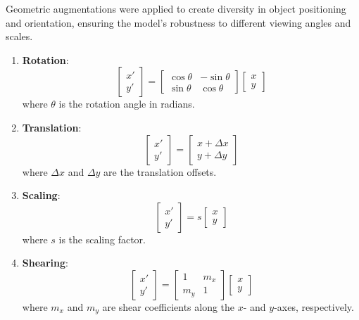 \documentclass[conference]{IEEEtran}
\begin{document}
Geometric augmentations were applied to create diversity in object positioning and orientation, ensuring the model's robustness to different viewing angles and scales.

\begin{enumerate}
    \item \textbf{Rotation}:
    \[
    \begin{bmatrix}
    x' \\ y'
    \end{bmatrix}
    =
    \begin{bmatrix}
    \cos \theta & -\sin \theta \\
    \sin \theta & \cos \theta
    \end{bmatrix}
    \begin{bmatrix}
    x \\ y
    \end{bmatrix}
    \]
    where \( \theta \) is the rotation angle in radians.

    \item \textbf{Translation}:
    \[
    \begin{bmatrix}
    x' \\ y'
    \end{bmatrix}
    =
    \begin{bmatrix}
    x + \Delta x \\ y + \Delta y
    \end{bmatrix}
    \]
    where \( \Delta x \) and \( \Delta y \) are the translation offsets.

    \item \textbf{Scaling}:
    \[
    \begin{bmatrix}
    x' \\ y'
    \end{bmatrix}
    = s
    \begin{bmatrix}
    x \\ y
    \end{bmatrix}
    \]
    where \( s \) is the scaling factor.

    \item \textbf{Shearing}:
    \[
    \begin{bmatrix}
    x' \\ y'
    \end{bmatrix}
    =
    \begin{bmatrix}
    1 & m_x \\
    m_y & 1
    \end{bmatrix}
    \begin{bmatrix}
    x \\ y
    \end{bmatrix}
    \]
    where \( m_x \) and \( m_y \) are shear coefficients along the \( x \)- and \( y \)-axes, respectively.
\end{enumerate}
\end{document}
